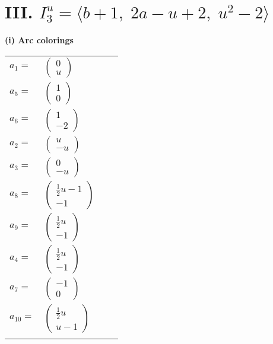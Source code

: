 \documentclass[1p]{elsarticle_modified}
\theoremstyle{definition}
\begin{document}
\centering \section*{III. $I^u_{3}= \langle b+1,\;2 a- u+2,\;u^2-2 \rangle$}
\flushleft \textbf{(i) Arc colorings}\\
\begin{tabular}{m{7pt} m{180pt} m{7pt} m{180pt} }
\flushright $a_{1}=$&$\begin{pmatrix}0\\u\end{pmatrix}$ \\
\flushright $a_{5}=$&$\begin{pmatrix}1\\0\end{pmatrix}$ \\
\flushright $a_{6}=$&$\begin{pmatrix}1\\-2\end{pmatrix}$ \\
\flushright $a_{2}=$&$\begin{pmatrix}u\\- u\end{pmatrix}$ \\
\flushright $a_{3}=$&$\begin{pmatrix}0\\- u\end{pmatrix}$ \\
\flushright $a_{8}=$&$\begin{pmatrix}\frac{1}{2} u-1\\-1\end{pmatrix}$ \\
\flushright $a_{9}=$&$\begin{pmatrix}\frac{1}{2} u\\-1\end{pmatrix}$ \\
\flushright $a_{4}=$&$\begin{pmatrix}\frac{1}{2} u\\-1\end{pmatrix}$ \\
\flushright $a_{7}=$&$\begin{pmatrix}-1\\0\end{pmatrix}$ \\
\flushright $a_{10}=$&$\begin{pmatrix}\frac{1}{2} u\\u-1\end{pmatrix}$\\&\end{tabular}
\end{document}
